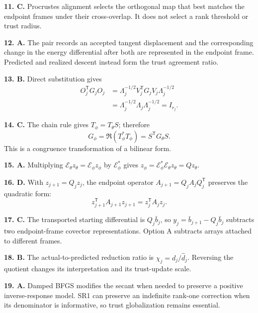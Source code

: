 \documentclass[10pt,twocolumn]{article}
\begin{document}
\textbf{11. C.} Procrustes alignment selects the orthogonal map that best
matches the endpoint frames under their cross-overlap. It does not select a
rank threshold or trust radius.

\textbf{12. A.} The pair records an accepted tangent displacement and the
corresponding change in the energy differential after both are represented in
the endpoint frame. Predicted and realized descent instead form the trust
agreement ratio.

\textbf{13. B.} Direct substitution gives
\begin{equation*}
\begin{aligned}
O_j^{\mathsf T}G_jO_j
&=\Lambda_j^{-1/2}V_j^{\mathsf T}G_jV_j\Lambda_j^{-1/2}\\
&=\Lambda_j^{-1/2}\Lambda_j\Lambda_j^{-1/2}=I_{r_j}.
\end{aligned}
\end{equation*}

\textbf{14. C.} The chain rule gives \(T_\phi=T_\theta S\); therefore
\begin{equation*}
G_\phi=\Re(T_\phi^*T_\phi)
=S^{\mathsf T}G_\theta S.
\end{equation*}
This is a congruence transformation of a bilinear form.

\textbf{15. A.} Multiplying
\(\mathcal E_\theta z_\theta=\mathcal E_\phi z_\phi\) by
\(\mathcal E_\phi^*\) gives
\(z_\phi=\mathcal E_\phi^*\mathcal E_\theta z_\theta=Qz_\theta\).

\textbf{16. D.} With \(z_{j+1}=Q_jz_j\), the endpoint operator
\(A_{j+1}=Q_jA_jQ_j^{\mathsf T}\) preserves the quadratic form:
\begin{equation*}
z_{j+1}^{\mathsf T}A_{j+1}z_{j+1}
=z_j^{\mathsf T}A_jz_j.
\end{equation*}

\textbf{17. C.} The transported starting differential is
\(Q_j\bar b_j\), so
\(y_j=\bar b_{j+1}-Q_j\bar b_j\) subtracts two endpoint-frame covector
representations. Option A subtracts arrays attached to different frames.

\textbf{18. B.} The actual-to-predicted reduction ratio is
\(\chi_j=d_j/\widehat d_j\). Reversing the quotient changes its interpretation
and its trust-update scale.

\textbf{19. A.} Damped BFGS modifies the secant when needed to preserve a
positive inverse-response model. SR1 can preserve an indefinite rank-one
correction when its denominator is informative, so trust globalization remains
essential.
\end{document}
